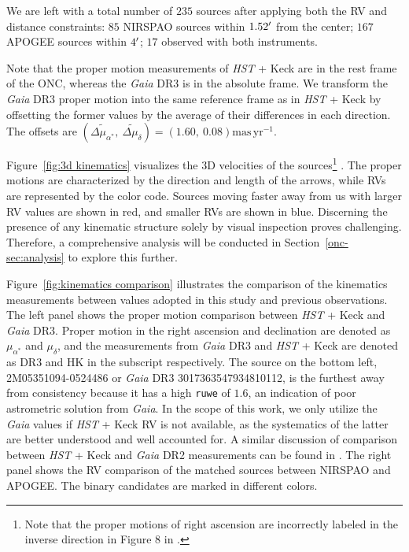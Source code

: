 \documentclass[12pt]{ucsddissertation}
\begin{document}
\begin{CJK*}{UTF8}{gbsn}
We are left with a total number of $235$ sources after applying both the RV and distance constraints: $85$ NIRSPAO sources within $1.52\mbox{$^\prime$}$ from the center; $167$ APOGEE sources within $4\mbox{$^\prime$}$; $17$ observed with both instruments. 

Note that the proper motion measurements of \textit{HST} + Keck are in the rest frame of the ONC, whereas the \textit{Gaia} DR3 is in the absolute frame. We transform the \textit{Gaia} DR3 proper motion into the same reference frame as in \textit{HST} + Keck by offsetting the former values by the average of their differences in each direction. The offsets are $\left(\widetilde{\Delta\mu_{\alpha^*}},~\widetilde{\Delta\mu_{\delta}}\right) = \left(1.60,~0.08\right) \mathrm{mas}\,\mathrm{yr}^{-1}$. 

Figure~\ref{fig:3d kinematics} visualizes the 3D velocities of the sources\footnote{Note that the proper motions of right ascension are incorrectly labeled in the inverse direction in Figure 8 in .}
. The proper motions are characterized by the direction and length of the arrows, while RVs are represented by the color code. Sources moving faster away from us with larger RV values are shown in red, and smaller RVs are shown in blue. Discerning the presence of any kinematic structure solely by visual inspection proves challenging. Therefore, a comprehensive analysis will be conducted in Section~\ref{onc-sec:analysis} to explore this further.

Figure~\ref{fig:kinematics comparison} illustrates the comparison of the kinematics measurements between values adopted in this study and previous observations. The left panel shows the proper motion comparison between \textit{HST} + Keck and \textit{Gaia} DR3. Proper motion in the right ascension and declination are denoted as $\mu_{\alpha^*}$ and $\mu_\delta$, and the measurements from \textit{Gaia} DR3 and \textit{HST} + Keck are denoted as DR3 and HK in the subscript respectively. The source on the bottom left, 2M05351094-0524486 or \textit{Gaia} DR3 3017363547934810112, is the furthest away from consistency because it has a high \texttt{ruwe} of $1.6$, an indication of poor astrometric solution from \textit{Gaia}. In the scope of this work, we only utilize the \textit{Gaia} values if \textit{HST} + Keck RV is not available, as the systematics of the latter are better understood and well accounted for. A similar discussion of comparison between \textit{HST} + Keck and \textit{Gaia} DR2 measurements can be found in . The right panel shows the RV comparison of the matched sources between NIRSPAO and APOGEE. The binary candidates are marked in different colors.


\end{CJK*}
\end{document}
